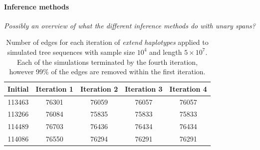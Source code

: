 \documentclass[10pt,twoside,lineno]{gsajnl}
\newcommand{\comment}[1]{{\color{violet} \it #1}}
\begin{document}
\paragraph{Inference methods}
\comment{Possibly an overview of what the different inference methods do with unary spans?}



\appendix


\begin{table}[hbt]
\begin{center}
\begin{tabular}{|c|c|c|c|c|}
	\hline
	Initial & Iteration 1 & Iteration 2 & Iteration 3 & Iteration 4 \\
	\hline
	\hline
	113463	&	76301	&	76059	&	76057	&	76057 \\
	\hline
	113266 & 76084	&	75835	&	75833	&	75833 \\
	\hline
	114489 & 76703 & 76436 & 76434 & 76434 \\
	\hline
	114086	& 76550	& 76294	& 76291	& 76291\\
	\hline
\end{tabular}
\caption{Number of edges for each iteration of \textit{extend haplotypes} applied to 
simulated tree sequences with sample size $10^4$ and length $5\times 10^7$. 
Each of the simulations terminated by the fourth iteration, however 99\% of the edges
are removed within the first iteration.}
\label{tab:edge-counts}
\end{center}
\end{table}
\end{document}
